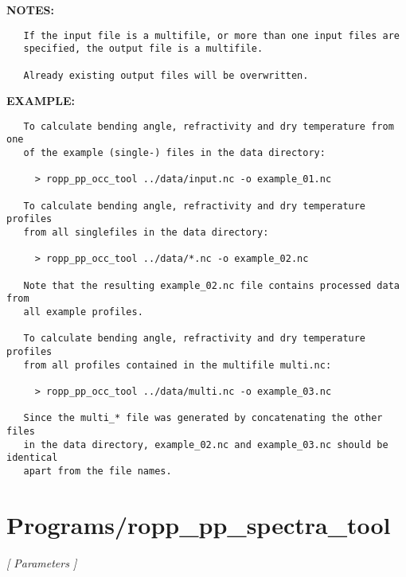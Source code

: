 \textbf{NOTES:}\hspace{0.08in}\begin{Verbatim}
   If the input file is a multifile, or more than one input files are
   specified, the output file is a multifile.

   Already existing output files will be overwritten.
\end{Verbatim}
\textbf{EXAMPLE:}\hspace{0.08in}\begin{Verbatim}
   To calculate bending angle, refractivity and dry temperature from one
   of the example (single-) files in the data directory:

     > ropp_pp_occ_tool ../data/input.nc -o example_01.nc

   To calculate bending angle, refractivity and dry temperature profiles
   from all singlefiles in the data directory:

     > ropp_pp_occ_tool ../data/*.nc -o example_02.nc

   Note that the resulting example_02.nc file contains processed data from
   all example profiles.

   To calculate bending angle, refractivity and dry temperature profiles 
   from all profiles contained in the multifile multi.nc:

     > ropp_pp_occ_tool ../data/multi.nc -o example_03.nc

   Since the multi_* file was generated by concatenating the other files
   in the data directory, example_02.nc and example_03.nc should be identical
   apart from the file names.
\end{Verbatim}
\section{Programs/ropp\_pp\_spectra\_tool}
\textsl{[ Parameters ]}

